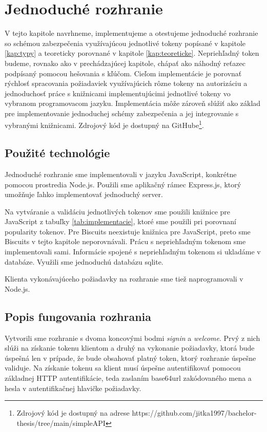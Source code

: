 \chapter{Jednoduché rozhranie}

\label{kap:prakticke} %

V tejto kapitole navrhneme, implementujeme a otestujeme jednoduché rozhranie so schémou zabezpečenia využívajúcou jednotlivé tokeny popísané v kapitole \ref{kap:typy} a teoreticky porovnané v kapitole \ref{kap:teoreticke}. Nepriehľadný token budeme, rovnako ako v prechádzajúcej kapitole, chápať ako náhodný reťazec podpísaný pomocou hešovania s kľúčom. Cieľom implementácie je porovnať rýchlosť spracovania požiadaviek využívajúcich rôzne tokeny na autorizáciu a jednoduchosť práce s knižnicami implementujúcimi jednotlivé tokeny vo vybranom programovacom jazyku. Implementácia môže zároveň slúžiť ako základ pre implementovanie jednoduchej schémy zabezpečenia a jej integrovanie s vybranými knižnicami. Zdrojový kód je dostupný na GitHube\footnote{Zdrojový kód je dostupný na adrese https://github.com/jitka1997/bachelor-thesis/tree/main/simpleAPI}.

\section{Použité technológie}

Jednoduché rozhranie sme implementovali v jazyku JavaScript, konkrétne pomocou prostredia Node.js. Použili sme aplikačný rámec Express.js, ktorý umožňuje ľahko implementovať jednoduchý server.

Na vytváranie a validáciu jednotlivých tokenov sme použili knižnice pre JavaScript z tabuľky \ref{tab:implementacie}, ktoré sme použili pri porovnaní popularity tokenov. Pre Biscuits neexistuje knižnica pre JavaScript, preto sme Biscuits v tejto kapitole neporovnávali. Prácu s nepriehľadným tokenom sme implementovali sami. Informácie spojené s nepriehľadným tokenom si ukladáme v databáze. Využili sme jednoduchú databázu sqlite.

Klienta vykonávajúceho požiadavky na rozhranie sme tiež naprogramovali v Node.js.

\section{Popis fungovania rozhrania}

Vytvorili sme rozhranie s dvoma koncovými bodmi \textit{signin} a \textit{welcome}. Prvý z nich slúži na získanie tokenu klientom a druhý na vykonanie požiadavky, ktorá bude úspešná len v prípade, že bude obsahovať platný token, ktorý rozhranie úspešne validuje. Na získanie tokenu sa klient musí úspešne autentifikovať pomocou základnej HTTP autentifikácie, teda zaslaním base64url \cite{base64_rfc} zakódovaného mena a hesla v autentifikačnej hlavičke požiadavky.

